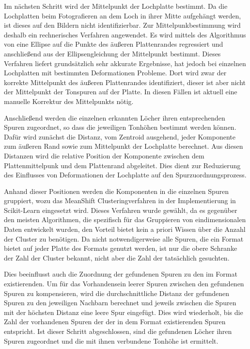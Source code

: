 Im nächsten Schritt wird der Mittelpunkt der Lochplatte bestimmt.
Da die Lochplatten beim Fotografieren an dem Loch in ihrer Mitte aufgehängt werden, ist dieses auf den Bildern nicht identifizierbar.
Zur Mittelpunkbestimmung wird deshalb ein rechnerisches Verfahren angewendet.
Es wird mittels des Algorithmus von \textcite[]{halir1998numerically} eine Ellipse auf die Punkte des äußeren Plattenrandes regressiert und anschließend aus der Ellipsengleichung der Mittelpunkt bestimmt.
Dieses Verfahren liefert grundsätzlich sehr akkurate Ergebnisse, hat jedoch bei einzelnen Lochplatten mit bestimmten Deformationen Probleme.
Dort wird zwar der korrekte Mittelpunkt des äußeren Plattenrandes identifiziert, dieser ist aber nicht der Mittelpunkt der Tonspuren auf der Platte.
In diesen Fällen ist aktuell eine manuelle Korrektur des Mittelpunkts nötig.

Anschließend werden die einzelnen erkannten Löcher ihren entsprechenden Spuren zugeordnet, so dass die jeweiligen Tonhöhen bestimmt werden können.
Dafür wird zunächst die Distanz, vom Zentroid ausgehend, jeder Komponente zum äußeren Rand sowie zum Mittelpunkt der Lochplatte berechnet.
Aus diesen Distanzen wird die relative Position der Komponente zwischen dem Plattenmittelpunk und dem Plattenrand abgeleitet.
Dies dient zur Reduzierung des Einflusses von Deformationen der Lochplatte auf den Spurzuordnungsprozess.

Anhand dieser Positionen werden die Komponenten in die einzelnen Spuren gruppiert, wozu das MeanShift Clusteringverfahren \parencite[]{meanshift} in der Implementierung in Scikit-Learn \parencite[]{scikit-learn} eingesetzt wird.
Dieses Verfahren wurde gewählt, da es gegenüber den meisten Algorithmen, die spezifisch für das Gruppieren von eindimensionalen Daten entwickelt wurden, den Vorteil bietet kein a priori Wissen über die Anzahl der Cluster zu benötigen.
Da nicht notwendigerweise alle Spuren, die ein Format bietet auf jeder Platte des Formats genutzt werden, ist nur die obere Schranke der Zahl der Cluster bekannt, nicht aber die Zahl der tatsächlich gesuchten.

Dies beeinflusst auch die Zuordnung der gefundenen Spuren zu den im Format existierenden.
Um für das Vorhandensein leerer Spuren zwischen den gefundenen Spuren zu kompensieren, wird die durchschnittliche Distanz der gefundenen Spuren zu den jeweiligen Nachbarn berechnet und jeweils zwischen die Spuren mit der höchsten Distanz eine leere Spur eingefügt.
Dies wird wiederholt, bis die Zahl der vorhandenen Spuren der der in dem Format existierenden Spuren entspricht.
Ist dieser Schritt abgeschlossen, sind die gefundenen Löcher ihren Spuren zugeordnet und die mit ihnen verbundene Tonhöhe ist ermittelt.

